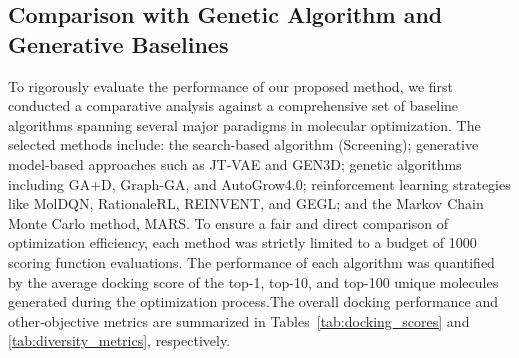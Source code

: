 \documentclass[lettersize,journal]{IEEEtran}
\begin{document}
\subsection{Comparison with Genetic Algorithm and Generative Baselines}
To rigorously evaluate the performance of our proposed method, we first conducted a comparative analysis against a comprehensive set of baseline algorithms spanning several major paradigms in molecular optimization. The selected methods include: the search-based algorithm (Screening\cite{graff2021accelerating}); generative model-based approaches such as JT-VAE and GEN3D\cite{luoGraph2022}; genetic algorithms including GA+D\cite{nigamAugmentingGeneticAlgorithms2020}, Graph-GA\cite{jensenGraphBasedGeneticAlgorithm2019}, and AutoGrow4.0\cite{spiegelAutoGrow4OpensourceGenetic2020}; reinforcement learning strategies like MolDQN\cite{zhou2019optimization}, RationaleRL\cite{jinMultiObjectiveMoleculeGeneration2020}, REINVENT\cite{olivecronaMolecularDeNovoDesign2017}, and GEGL\cite{ahnGuidingDeepMolecular2020}; and the Markov Chain Monte Carlo method, MARS\cite{xie2021marsmarkovmolecularsampling}. To ensure a fair and direct comparison of optimization efficiency, each method was strictly limited to a budget of 1000 scoring function evaluations. The performance of each algorithm was quantified by the average docking score of the top-1, top-10, and top-100 unique molecules generated during the optimization process.The overall docking performance and other‑objective metrics are summarized in Tables~\ref{tab:docking_scores} and \ref{tab:diversity_metrics}, respectively.
\end{document}
